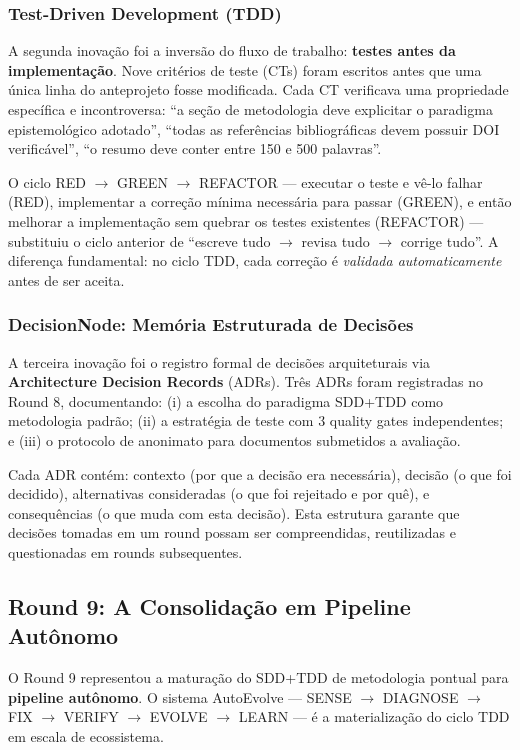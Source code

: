 \subsubsection{Test-Driven Development (TDD)}

A segunda inovação foi a inversão do fluxo de trabalho: \textbf{testes antes
da implementação}. Nove critérios de teste (CTs) foram escritos antes que
uma única linha do anteprojeto fosse modificada. Cada CT verificava uma
propriedade específica e incontroversa: ``a seção de metodologia deve
explicitar o paradigma epistemológico adotado'', ``todas as referências
bibliográficas devem possuir DOI verificável'', ``o resumo deve conter
entre 150 e 500 palavras''.

O ciclo RED $\to$ GREEN $\to$ REFACTOR — executar o teste e vê-lo falhar
(RED), implementar a correção mínima necessária para passar (GREEN), e
então melhorar a implementação sem quebrar os testes existentes (REFACTOR)
— substituiu o ciclo anterior de ``escreve tudo $\to$ revisa tudo $\to$
corrige tudo''. A diferença fundamental: no ciclo TDD, cada correção é
\textit{validada automaticamente} antes de ser aceita.

\subsubsection{DecisionNode: Memória Estruturada de Decisões}

A terceira inovação foi o registro formal de decisões arquiteturais via
\textbf{Architecture Decision Records} (ADRs). Três ADRs foram registradas
no Round 8, documentando: (i) a escolha do paradigma SDD+TDD como metodologia
padrão; (ii) a estratégia de teste com 3 quality gates independentes; e
(iii) o protocolo de anonimato para documentos submetidos a avaliação.

Cada ADR contém: contexto (por que a decisão era necessária), decisão (o que
foi decidido), alternativas consideradas (o que foi rejeitado e por quê), e
consequências (o que muda com esta decisão). Esta estrutura garante que
decisões tomadas em um round possam ser compreendidas, reutilizadas e
questionadas em rounds subsequentes.

\subsection{Round 9: A Consolidação em Pipeline Autônomo}

O Round 9 representou a maturação do SDD+TDD de metodologia pontual para
\textbf{pipeline autônomo}. O sistema AutoEvolve — SENSE $\to$ DIAGNOSE
$\to$ FIX $\to$ VERIFY $\to$ EVOLVE $\to$ LEARN — é a materialização do
ciclo TDD em escala de ecossistema.

